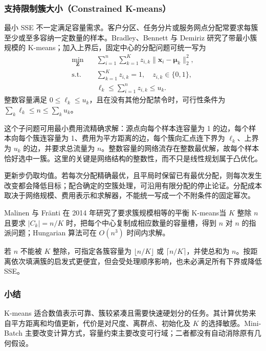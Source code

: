 \subsubsection{支持限制簇大小（Constrained K-means）}
\label{sec:clustering-capacity}

最小 SSE 不一定满足容量需求。客户分区、任务分片或服务网点分配常要求每簇至少或至多容纳一定数量的样本。Bradley、Bennett 与 Demiriz 研究了带最小簇规模的 K-means；加入上界后，固定中心的分配问题可统一写为
\begin{equation}
 \begin{aligned}
 \min_{\bm{Z}}\quad&
   \sum_{i=1}^n\sum_{k=1}^K
   z_{i,k}\lVert\bm{x}_i-\bm{\mu}_k\rVert_2^2,\\
 \text{s.t.}\quad&
   \sum_{k=1}^K z_{i,k}=1,\quad z_{i,k}\in\{0,1\},\\
 & \ell_k\leq\sum_{i=1}^n z_{i,k}\leq u_k.
 \end{aligned}
 \label{eq:clustering-capacity}
\end{equation}
整数容量满足 $0\leq\ell_k\leq u_k$，且在没有其他分配禁令时，可行性条件为 $\sum_k\ell_k\leq n\leq\sum_ku_k$。

这个子问题可用最小费用流精确求解：源点向每个样本连容量为 1 的边，每个样本向每个簇连容量为 1、费用为平方距离的边，每个簇向汇点连下界为 $\ell_k$、上界为 $u_k$ 的边，并要求总流量为 $n$。整数容量的网络流存在整数最优解，故每个样本恰好选中一簇。这里的关键是网络结构的整数性，而不只是线性规划属于凸优化。

更新步仍取均值。若每次分配精确最优，且平局时保留已有最优分配，则每次发生改变都会降低目标；配合确定的空簇处理，可沿用有限分配的停止论证。分配成本取决于网络规模、费用表示和求解器，不能统一写成一个不附条件的固定幂次。

Malinen 与 Fränti 在 2014 年研究了要求簇规模相等的平衡 K-means当 $K$ 整除 $n$ 且要求 $|C_k|=n/K$ 时，把每个中心复制成相应数量的容量槽，得到 $n$ 对 $n$ 的指派问题；Hungarian 算法可在 $O(n^3)$ 时间内求解。

若 $n$ 不能被 $K$ 整除，可指定各簇容量为 $\lfloor n/K\rfloor$ 或 $\lceil n/K\rceil$，并使总和为 $n$。按距离依次填满簇的启发式更便宜，但会受处理顺序影响，也未必满足所有下界或降低 SSE。

\subsubsection{小结}

K-means 适合数值表示可靠、簇较紧凑且需要快速硬划分的任务。其计算优势来自平方距离和均值更新，代价是对尺度、离群点、初始化及 $K$ 的选择敏感。Mini-Batch 主要改变计算方式，容量约束主要改变可行域；二者都没有自动消除原有几何假设。

